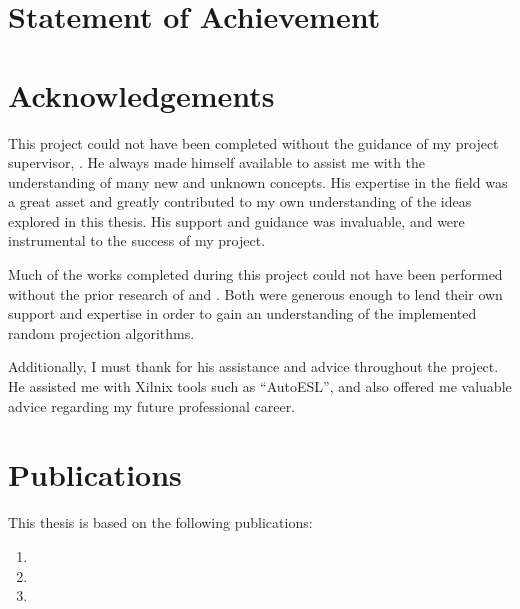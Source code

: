 \documentclass[a4paper]{report}
\title{\thesisTitle*{}}
\author{\studentName*{}}
\date{\thesisDate*{}}
\begin{document}
\begin{titlepage}

\end{titlepage}



\chapter*{Statement of Achievement}


\chapter*{Acknowledgements}
This project could not have been completed without the guidance of my project 
supervisor, \supervisorName{}. He always made himself available to assist me 
with the understanding of many new and unknown concepts. His expertise in the 
field was a great asset and greatly contributed to my own understanding of the 
ideas explored in this thesis. His support and guidance was invaluable, and were
instrumental to the success of my project.

Much of the works completed during this project could not have been performed 
without the prior research of  and . Both were
generous enough to lend their own support and expertise in order to gain an 
understanding of the implemented random projection algorithms.

Additionally, I must thank  for his assistance and advice 
throughout the project. He assisted me with Xilnix tools such as ``AutoESL'', 
and also offered me valuable advice regarding my future professional career.

\chapter*{Publications}
This thesis is based on the following publications:
\begin{enumerate}
\item {}
\item {}
\item {}
\end{enumerate}
\end{document}
